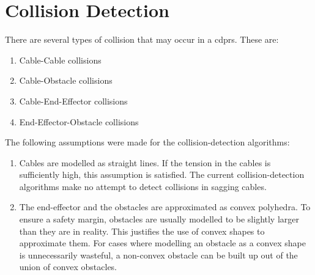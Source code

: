 \chapter{Collision Detection}%
\label{chap:collision_detection}

	There are several types of collision that may occur in a \glspl{cdpr}. These
	are:

	\begin{enumerate}

		\item Cable-Cable collisions

		\item Cable-Obstacle collisions

		\item Cable-End-Effector collisions

		\item End-Effector-Obstacle collisions

	\end{enumerate}

	The following assumptions were made for the collision-detection
	algorithms:

	\begin{enumerate}

		\item

			Cables are modelled as straight lines. If the tension in the cables
			is sufficiently high, this assumption is satisfied. The current
			collision-detection algorithms make no attempt to detect collisions
			in sagging cables.

		\item

			The end-effector and the obstacles are approximated as convex
			polyhedra. To ensure a safety margin, obstacles are usually modelled
			to be slightly larger than they are in reality. This justifies the
			use of convex  shapes to approximate them. For cases where modelling
			an obstacle as a convex shape is unnecessarily wasteful, a
			non-convex obstacle can be built up out of the union of convex
			obstacles.

	\end{enumerate}

	
	
	
	
